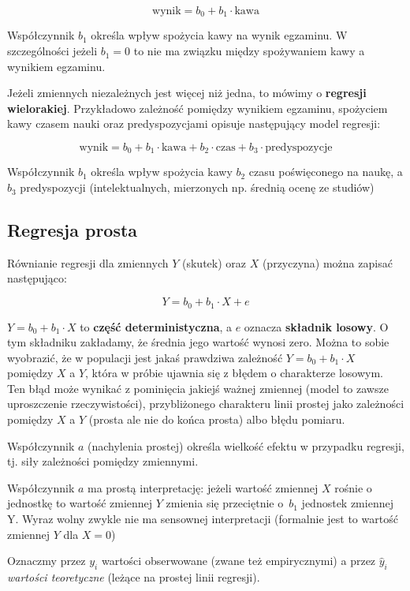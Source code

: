 \documentclass[
  openany]{book}
\begin{document}
\[ \textrm{wynik} = b_0 + b_1 \cdot \textrm{kawa}\]

Współczynnik \(b_1\) określa wpływ spożycia kawy na wynik egzaminu.
W szczególności jeżeli \(b_1 = 0\) to
nie ma związku między spożywaniem kawy a wynikiem egzaminu.

Jeżeli zmiennych niezależnych jest więcej niż jedna,
to mówimy o \textbf{regresji wielorakiej}. Przykładowo
zależność
pomiędzy wynikiem egzaminu, spożyciem kawy czasem nauki oraz predyspozycjami
opisuje następujący model regresji:

\[\textrm{wynik} = b_0 + b_1 \cdot \textrm{kawa} + b_2 \cdot \textrm{czas} + b_3 \cdot \textrm{predyspozycje} \]

Współczynnik \(b_1\) określa wpływ spożycia kawy
\(b_2\) czasu poświęconego na naukę,
a \(b_3\) predyspozycji
(intelektualnych, mierzonych np. średnią ocenę ze studiów)

\hypertarget{regresja-prosta}{%
\subsection{Regresja prosta}\label{regresja-prosta}}

Równianie regresji dla zmiennych \(Y\) (skutek) oraz \(X\) (przyczyna) można zapisać następująco:

\[Y = b_0 + b_1 \cdot X + e \]

\(Y = b_0 + b_1 \cdot X\) to \textbf{część deterministyczna},
a \(e\) oznacza \textbf{składnik losowy}.
O tym składniku zakładamy, że średnia jego wartość wynosi zero.
Można to sobie wyobrazić, że w populacji jest jakaś prawdziwa zależność
\(Y = b_0 + b_1 \cdot X\) pomiędzy \(X\) a \(Y\), która w próbie
ujawnia się z błędem o charakterze losowym. Ten błąd może wynikać
z pominięcia jakiejś ważnej zmiennej (model
to zawsze uproszczenie rzeczywistości), przybliżonego charakteru linii
prostej jako zależności pomiędzy \(X\) a \(Y\) (prosta ale nie do końca prosta)
albo błędu pomiaru.

Współczynnik \(a\) (nachylenia prostej) określa wielkość efektu
w przypadku regresji, tj. siły zależności pomiędzy zmiennymi.

Współczynnik \(a\) ma prostą interpretację: jeżeli wartość zmiennej \(X\)
rośnie o jednostkę to wartość zmiennej \(Y\) zmienia
się przeciętnie o~\(b_1\) jednostek zmiennej Y.
Wyraz wolny zwykle nie ma sensownej interpretacji
(formalnie jest to wartość zmiennej \(Y\) dla \(X=0\))

Oznaczmy przez \(y_i\) wartości obserwowane (zwane też empirycznymi)
a przez \(\hat y_i\) \emph{wartości teoretyczne} (leżące na prostej linii regresji).
\end{document}

